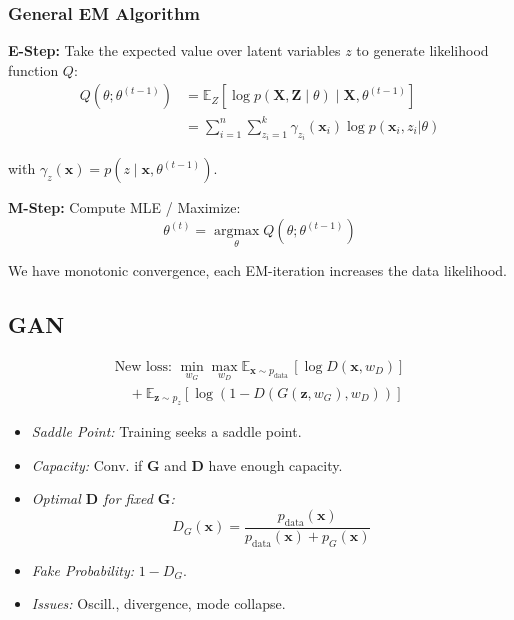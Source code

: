 \documentclass[a4paper,11pt]{article}
\begin{document}
\subsubsection*{General EM Algorithm}

\textbf{E-Step:} Take the expected value over latent variables $z$ to generate likelihood function $Q$:
$$
\begin{aligned}
Q(\theta ; \theta^{(t-1)}) & =\mathbb{E}_Z[\log p(\mathbf{X}, \mathbf{Z} \mid \theta) \mid \mathbf{X}, \theta^{(t-1)}] \\
&\textstyle =\sum_{i=1}^n \sum_{z_i=1}^k \gamma_{z_i}(\mathbf{x}_i) \log p(\mathbf{x}_i, z_i | \theta)
\end{aligned}
$$

with $\gamma_z(\mathbf{x})=p\left(z \mid \mathbf{x}, \theta^{(t-1)}\right)$.

\textbf{M-Step:} Compute MLE / Maximize:
$$
\theta^{(t)}=\underset{\theta}{\operatorname{argmax}} Q\left(\theta ; \theta^{(t-1)}\right)
$$

We have monotonic convergence, each EM-iteration increases the data likelihood.

\subsection*{GAN}

$$
\begin{aligned}
\text{New loss: }\min _{w_G} \max _{w_D} \mathbb{E}_{\mathbf{x} \sim p_{\text {data }}}\left[\log D\left(\mathbf{x}, w_D\right)\right] \\
\quad+\mathbb{E}_{\mathbf{z} \sim p_z}\left[\log \left(1-D\left(G\left(\mathbf{z}, w_G\right), w_D\right)\right)\right]
\end{aligned}
$$

\begin{itemize}
  \item \textit{Saddle Point:} Training seeks a saddle point.
  \item \textit{Capacity:} Conv. if $\mathbf{G}$ and $\mathbf{D}$ have enough capacity.
  \item \textit{Optimal $\mathbf{D}$ for fixed $\mathbf{G}$:}
  $$
  D_G(\mathbf{x}) = \frac{p_{\text{data}}(\mathbf{x})}{p_{\text{data}}(\mathbf{x}) + p_G(\mathbf{x})}
  $$
  \item \textit{Fake Probability:} $1 - D_G$.
  \item \textit{Issues:} Oscill., divergence, mode collapse.
\end{itemize}
\end{document}
